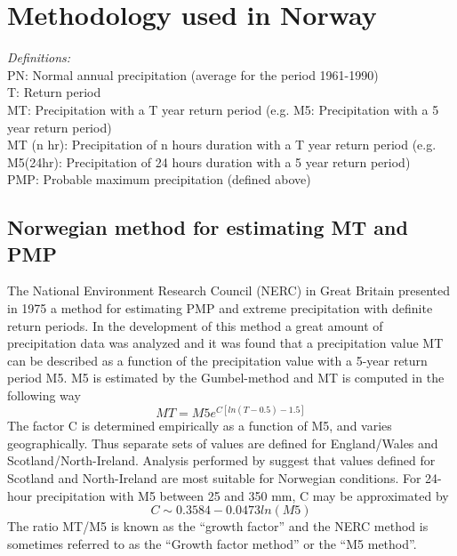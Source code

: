 \documentclass[12pt,a4paper,english]{article}
\begin{document}
\section{Methodology used in Norway}

\textsl{Definitions:}\\
PN:  Normal annual precipitation (average for the period 1961-1990)\\
T: Return period\\
MT: Precipitation with a T year return period (e.g. M5: Precipitation with a 5 year return period)\\
MT (n hr): Precipitation of n hours duration with a T year return period (e.g. M5(24hr): Precipitation of 24 hours duration with a 5 year return period)\\
PMP: Probable maximum precipitation (defined above)\\

\subsection{Norwegian method for estimating MT and PMP}

\noindent The National Environment Research Council (NERC) in Great Britain presented in 1975 a method for estimating PMP and extreme precipitation with definite return periods. In the development of this method a great amount of precipitation data was analyzed and it was found that a precipitation value MT can be described as a function of the precipitation value with a 5-year return period M5. M5 is estimated by the Gumbel-method \citep{Gumbel2004} and MT is computed in the following way
\begin{equation}
MT=M5 e^{C[ln(T-0.5)-1.5]}
\end{equation}
The factor C is determined empirically as a function of M5, and varies geographically. Thus separate sets of values are defined for England/Wales and Scotland/North-Ireland. Analysis performed by \cite{Forland1987} suggest that values defined for Scotland and North-Ireland are most suitable for Norwegian conditions. For 24-hour precipitation with M5 between 25 and 350 mm, C may be approximated by
\begin{equation}
C \sim0.3584 - 0.0473 ln(M5)
\end{equation}
The ratio MT/M5 is known as the ``growth factor'' and the NERC method is sometimes referred to as the ``Growth factor method'' or the ``M5 method''. 
\end{document}
